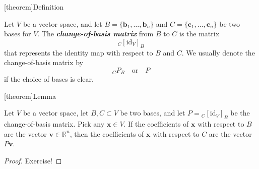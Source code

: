 \documentclass[12pt]{report}
\theoremstyle{definition}
\begin{document}
[theorem]{Definition}
\begin{change-of-basis matrix}
    Let $V$ be a vector space, and let
    $B = \{\mathbf{b}_1,\ldots,\mathbf{b}_n\}$ and
    $C = \{\mathbf{c}_1,\ldots,\mathbf{c}_n\}$ be two bases for $V$.
    The \textbf{\emph{change-of-basis matrix}} from $B$ to $C$ is the matrix\[
        {}_C{[\text{id}_V]}_{B}
    \]that represents the identity map with respect to $B$ and $C$.
    We usually denote the change-of-basis matrix by \[
        {}_C{P}_{B} \quad\text{or}\quad P
    \]if the choice of bases is clear.
\end{change-of-basis matrix}

[theorem]{Lemma}
\begin{coefficients with change-of-basis matrix}
    Let $V$ be a vector space, let $B,C\subset V$ be two bases,
    and let $P={}_C{[\text{id}_V]}_{B}$ be the change-of-basis matrix.
    Pick any $\mathbf{x}\in V$. If the coefficients of $\mathbf{x}$
    with respect to $B$ are the vector $\mathbf{v}\in\mathbb{R}^{n}$,
    then the coefficients of $\mathbf{x}$ with respect to $C$ are the vector
    $P\mathbf{v}$.
\end{coefficients with change-of-basis matrix}

\begin{proof}
    Exercise!
\end{proof} 
\end{document}
